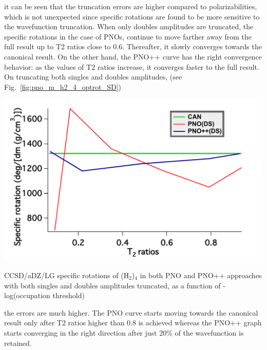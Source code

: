 it can be seen that the truncation errors are higher compared to polarizabilities, which is not 
unexpected since specific rotations are found to be more sensitive to the wavefunction truncation.
When only doubles amplitudes are truncated, the specific rotations in the case of PNOs, continue 
to move farther away from the full result up to T2 ratios close to 0.6. Thereafter, it slowly 
converges towards the canonical result. On the other hand, the PNO++ curve has the right
convergence behavior: as the values of T2 ratios increase, it converges faster to the full result.
On truncating both singles and doubles amplitudes, (see Fig.~\ref{fig:pno_m_h2_4_optrot_SD})
\begin{MyFigure}[h!]
\centering
\includegraphics[width=0.6\linewidth,natwidth=610,natheight=642]{figures_pno++/h2_4_optrot_lg_DS.pdf}
\caption{{\footnotesize CCSD/aDZ/LG specific rotations of (H$_2$)$_4$ in both PNO and PNO++ approaches
with both singles and doubles amplitudes truncated, as a function of -log(occupation threshold)}}
\label{fig:pno_m_h2_4_optrot_SD}
\end{MyFigure}
the errors are much higher. The PNO curve starts moving towards the canonical result only 
after T2 ratios higher than 0.8 is achieved whereas the PNO++ graph starts converging
in the right direction after just 20\% of the wavefunction is retained.
